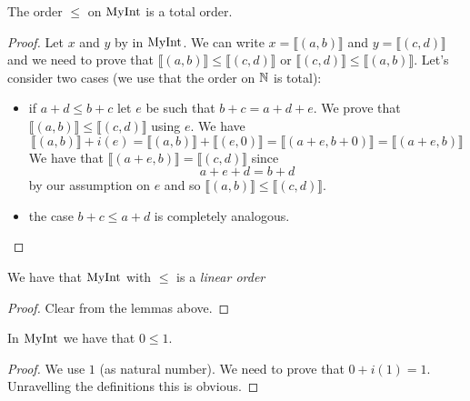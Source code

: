 \begin{lemma}
    \label{MyInt.le_total}
    \leanok
    The order $\leq$ on $\mathrm{MyInt}$ is a total order.
\end{lemma}
\begin{proof}
    \leanok
    Let $x$ and $y$ by in $\mathrm{MyInt}$. We can write $x = \llbracket (a,b) \rrbracket$ and
    $y = \llbracket (c,d) \rrbracket$ and we need to prove that
    $\llbracket (a,b) \rrbracket \leq \llbracket (c,d) \rrbracket$ or $\llbracket (c,d) \rrbracket \leq \llbracket (a,b) \rrbracket$. Let's consider two cases (we use that the order on $\mathbb{N}$ is total):
    \begin{itemize}
        \item if $a + d \leq b + c$ let $e$ be such that $b + c = a + d + e$. We prove that
        $\llbracket (a,b) \rrbracket \leq \llbracket (c,d) \rrbracket$ using $e$. We have
        \[
        \llbracket (a,b) \rrbracket+i(e) = \llbracket (a,b) \rrbracket + \llbracket (e,0) \rrbracket
        = \llbracket (a+e,b+0) \rrbracket = \llbracket (a+e,b) \rrbracket
        \]
        We have that $\llbracket (a+e,b) \rrbracket = \llbracket (c,d) \rrbracket$ since
        \[
        a+e+d=b+d
        \]
        by our assumption on $e$ and so $\llbracket (a,b) \rrbracket \leq \llbracket (c,d) \rrbracket$.
        \item the case $b + c \leq a + d$ is completely analogous.
    \end{itemize}
\end{proof}

\begin{lemma}
    \label{MyInt.linearOrder}
    \leanok
    We have that $\mathrm{MyInt}$ with $\leq$ is a \emph{linear order}
\end{lemma}
\begin{proof}
    \leanok
    Clear from the lemmas above.
\end{proof}

\begin{lemma}
    \label{MyInt.zero_le_one}
    \leanok
    In $\mathrm{MyInt}$ we have that $0 \leq 1$.
\end{lemma}
\begin{proof}
    \leanok
    We use $1$ (as natural number). We need to prove that $0 + i(1) = 1$. Unravelling the definitions
    this is obvious.
\end{proof}

